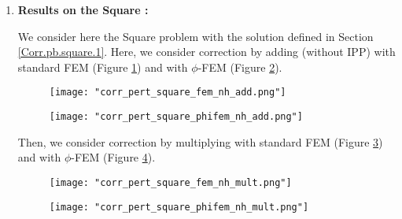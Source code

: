 \begin{enumerate}[label=\textbullet]
	\item \textbf{Results on the Square :}
	
	We consider here the Square problem with the solution defined in Section \ref{Corr.pb.square.1}. Here, we consider correction by adding (without IPP) with standard FEM (Figure \ref{corr_pert_square_fem_nh_add}) and with $\phi$-FEM (Figure \ref{corr_pert_square_phifem_nh_add}).
	
	\begin{minipage}{0.48\linewidth}
		\begin{figure}[H]
			\centering
			\texttt{[image: "corr\_pert\_square\_fem\_nh\_add.png"]}
			\label{corr_pert_square_fem_nh_add}
		\end{figure} 
	\end{minipage}
	\begin{minipage}{0.48\linewidth}
		\begin{figure}[H]
			\centering
			\texttt{[image: "corr\_pert\_square\_phifem\_nh\_add.png"]}
			\label{corr_pert_square_phifem_nh_add}
		\end{figure} 
	\end{minipage}
	
	Then, we consider correction by multiplying with standard FEM (Figure \ref{corr_pert_square_fem_nh_mult}) and with $\phi$-FEM (Figure \ref{corr_pert_square_phifem_nh_mult}).
	
	\begin{minipage}{0.48\linewidth}
		\begin{figure}[H]
			\centering
			\texttt{[image: "corr\_pert\_square\_fem\_nh\_mult.png"]}
			\label{corr_pert_square_fem_nh_mult}
		\end{figure} 
	\end{minipage}
	\begin{minipage}{0.48\linewidth}
		\begin{figure}[H]
			\centering
			\texttt{[image: "corr\_pert\_square\_phifem\_nh\_mult.png"]}
			\label{corr_pert_square_phifem_nh_mult}
		\end{figure} 
	\end{minipage}
\end{enumerate}

